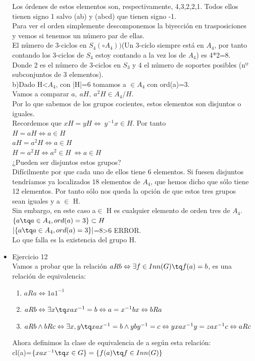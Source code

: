 \documentclass{apuntes}
\begin{document}
\begin{itemize}
 Los órdenes de estos elementos son, respectivamente, 4,3,2,2,1. Todos ellos tienen signo 1 salvo (ab) y (abcd) que tienen signo -1.\\
 Para ver el orden simplemente descomponemos la biyección en trasposiciones y vemos si tenemos un número par de ellas.\\
 El número de 3-ciclos en $S_4(\circ A_4))$(Un 3-ciclo siempre está en $A_4$, por tanto contando los 3-ciclos de $S_4$  estoy 
 contando a la vez los de $A_4$) es 4*2=8. Donde 2 es el número de 3-ciclos  en $S_3$  y 4 el número de soportes posibles (nº subconjuntos
 de 3 elementos).\\
 
 b)Dado H<$A_4$, con |H|=6 tomamos a $\in A_4$  con ord(a)=3.\\
 Vamos a comparar $a, \ aH, \ a^{2}H \in A_4/H$. \\
 Por lo que sabemos de los grupos cocientes, estos elementos son disjuntos o iguales.\\
 Recordemos que $xH=yH \Leftrightarrow \ y^{-1}x\in H$.  Por tanto\\
 $H=aH \Leftrightarrow a\in H$\\
 $aH=a^{2}H \Leftrightarrow a\in H$\\
 $H=a^{2}H \Leftrightarrow a^{2}\in H \ \Leftrightarrow a \in H$\\
 
 ¿Pueden ser disjuntos estos grupos? \\Difícilmente por que cada uno de ellos tiene 6 elementos. Si fuesen disjuntos tendríamos ya localizados
 18 elementos de $A_4$, que hemos dicho que sólo tiene 12 elementos. Por tanto sólo nos queda la opción de que estos tres grupos 
 sean iguales y a $\in$ H.\\
 Sin embargo, en este caso a$\in$ H es cualquier elemento de orden tres de $A_4$.\\
 $\{a \tq a \in A_4, ord(a)=3\}\subset H$\\
 $|\{a \tq a \in A_4, ord(a)=3\}|$=8>6 ERROR.\\
 Lo que falla es la existencia del grupo H.
 
 \item Ejercicio 12\\
 Vamos a probar que la relación $aRb \Leftrightarrow \exists f\in Inn(G) \tq f(a)=b$, es una relación de equivalencia:
 \begin{enumerate}
  \item $aRa \Leftrightarrow 1a1^{-1}$
  \item $aRb \Leftrightarrow \exists x \tq xax^{-1}=b \Leftrightarrow a=x^{-1}bx\Leftrightarrow bRa$
  \item $aRb \wedge bRc \Leftrightarrow \exists x,y \tq xax^{-1}=b \wedge yby^{-1}=c \Leftrightarrow yxax^{-1}y=zax^{-1}c \Leftrightarrow aRc$
 \end{enumerate}
 Ahora definimos la clase de equivalencia de a según esta relación:\\
 cl(a)=$\{xax^{-1} \tq x \in G\} = \{f(a) \tq f \in Inn(G)\}$
 

\end{itemize}
\end{document}
